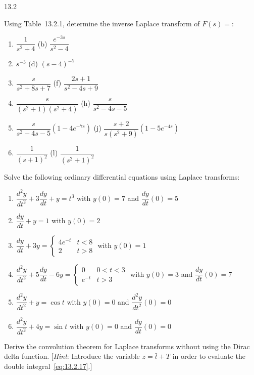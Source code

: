 \begin{exercises}{13.2}
\item Using Table~13.2.1, determine the inverse Laplace transform of $F(s) =$:
\begin{enumerate}
\item[(a)] $\dfrac{1}{s^2+4}$ \hfill (b) $\dfrac{e^{-3s}}{s^2-4}$
\item[(c)] $s^{-3}$ \hfill (d) $(s-4)^{-7}$
\item[\starred(e)] $\dfrac{s}{s^2+8s+7}$ \hfill (f) $\dfrac{2s+1}{s^2-4s+9}$
\item[(g)] $\dfrac{s}{(s^2+1)(s^2+4)}$ \hfill (h) $\dfrac{s}{s^2-4s-5}$
\item[(i)] $\dfrac{s}{s^2-4s-5}(1-4e^{-7s})$
      \hfill \starred(j) $\dfrac{s+2}{s(s^2+9)}(1-5e^{-4s})$
\item[(k)] $\dfrac{1}{(s+1)^2}$ \hfill (l) $\dfrac{1}{(s^2+1)^2}$
\end{enumerate}

\item Solve the following ordinary differential equations using Laplace transforms:
\begin{enumerate}
\item[(a)] $\dfrac{d^2y}{dt^2} + 3\dfrac{dy}{dt} + y = t^3$ with $y(0) = 7$ and $\dfrac{dy}{dt}(0) = 5$
\item[\starred(b)] $\dfrac{dy}{dt} + y = 1$ with $y(0) = 2$
\item[(c)] $\dfrac{dy}{dt} + 3y = \begin{cases} 4e^{-t} & t < 8 \\ 2 & t > 8 \end{cases}$ with $y(0) = 1$
\item[\starred(d)] $\dfrac{d^2y}{dt^2} + 5\dfrac{dy}{dt} - 6y = \begin{cases} 0 & 0 < t < 3 \\ e^{-t} & t > 3 \end{cases}$ with $y(0) = 3$ and $\dfrac{dy}{dt}(0) = 7$
\item[(e)] $\dfrac{d^2y}{dt^2} + y = \cos t$ with $y(0) = 0$ and $\dfrac{d^2y}{dt^2}(0) = 0$
\item[\starred(f)] $\dfrac{d^2y}{dt^2} + 4y = \sin t$ with $y(0) = 0$ and $\dfrac{dy}{dt}(0) = 0$
\end{enumerate}

\item Derive the convolution theorem for Laplace transforms without using the Dirac delta function.  [\emph{Hint}: Introduce the variable $z = \bar{t} + T$ in order to evaluate the double integral~\eqref{eq:13.2.17}.]


\end{exercises}
